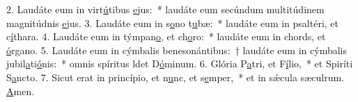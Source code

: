 2. Laudáte eum in virt\uline{ú}tibus \uline{e}jus:~* laudáte eum secúndum multitúdinem magnitúdnis \uline{e}jus.
3. Laudáte eum in s\uline{o}no t\uline{u}bæ:~* laudáte eum in psaltéri, et c\uline{í}thara.
4. Laudáte eum in týmpan\uline{o}, et ch\uline{o}ro:~* laudáte eum in chords, et \uline{ó}rgano.
5. Laudáte eum in cýmbalis benesonántibus:~† laudáte eum in cýmbalis jubil\uline{a}ti\uline{ó}nis:~* omnis spíritus ldet D\uline{ó}minum.
6. Glória P\uline{a}tri, et F\uline{í}lio,~* et Spiríti S\uline{a}ncto.
7. Sicut erat in princípio, et n\uline{u}nc, et s\uline{e}mper,~* et in sǽcula sæculrum. \uline{A}men.

